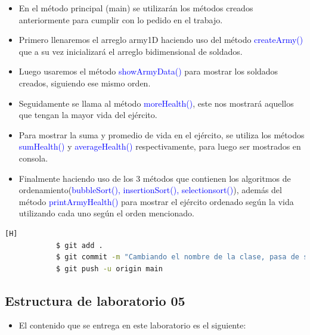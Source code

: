 \documentclass{article}
\begin{document}
        \begin{itemize}
            \item En el método principal (main) se utilizarán los métodos creados anteriormente para cumplir con lo pedido en el trabajo.
            \item Primero llenaremos el arreglo army1D haciendo uso del método \textcolor{blue}{createArmy()} que a su vez inicializará el arreglo bidimensional de soldados.
            \item Luego usaremos el método \textcolor{blue}{showArmyData()} para mostrar los soldados creados, siguiendo ese mismo orden.
            \item Seguidamente se llama al método \textcolor{blue}{moreHealth()}, este nos mostrará aquellos que tengan la mayor vida del ejército.
            \item Para mostrar la suma y promedio de vida en el ejército, se utiliza los métodos \textcolor{blue}{sumHealth()} y \textcolor{blue}{averageHealth()} respectivamente, para luego ser mostrados en consola.
            \item Finalmente haciendo uso de los 3 métodos que contienen los algoritmos de ordenamiento(\textcolor{blue}{bubbleSort(), insertionSort(), selectionsort()}), además del método \textcolor{blue}{printArmyHealth()} para mostrar el ejército ordenado según la vida utilizando cada uno según el orden mencionado.
        \end{itemize}
        
        
        
        \begin{lstlisting}[language=bash,caption={Commit: Último commit, donde se cambió el nombre de la clase a el pedido en el trabajo, el cual es: VideoJuego2.java}][H]
    		$ git add .
    		$ git commit -m "Cambiando el nombre de la clase, pasa de ser DemoBatalla a VideoJuego2"			
    		$ git push -u origin main
    	\end{lstlisting}

    
    \newpage
	\subsection{Estructura de laboratorio 05}
    \begin{itemize}	
		\item El contenido que se entrega en este laboratorio es el siguiente:
	\end{itemize}
	
\end{document}

